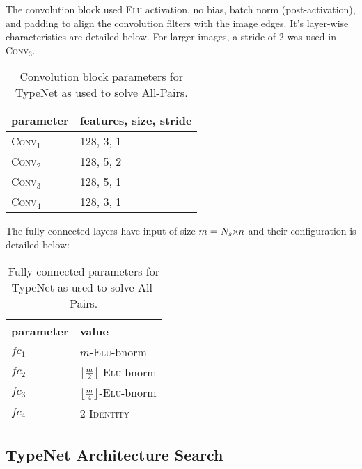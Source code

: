 The convolution block used \textsc{Elu} activation, no bias, batch norm (post-activation),
and padding to align the convolution filters with the image edges.  It's layer-wise characteristics are detailed below.  For larger images, a stride of 2 was used in \textsc{Conv}$_3$.
\begin{table}[!htb]
  \centering%
    \begin{tabular}{ l l }
    parameter & features, size, stride  \\
    \hline
    \textsc{Conv}$_1$ & 128, 3, 1  \\ 
    \textsc{Conv}$_2$ & 128, 5, 2  \\
    \textsc{Conv}$_3$ & 128, 5, 1  \\
    \textsc{Conv}$_4$ & 128, 3, 1  \\
    \end{tabular}
  \caption{Convolution block parameters for TypeNet as used to solve All-Pairs.}\label{detail_config_1}
\end{table}

\noindent
The fully-connected layers have input of size $m=N_s \TMS n$ and their configuration is detailed below:
\begin{table}[!htb]
  \centering%
    {\renewcommand{\arraystretch}{1.15}
    \begin{tabular}{ l l }
    parameter & value  \\
    \hline
    $fc_1$ & $m$-\textsc{Elu}-bnorm  \\
    $fc_2$ & $\floor*{\frac{m}{2}}$-\textsc{Elu}-bnorm  \\
    $fc_3$ & $\floor*{\frac{m}{4}}$-\textsc{Elu}-bnorm  \\
    $fc_4$ & $2$-\textsc{Identity}  \\
    \end{tabular}
    }
  \caption{Fully-connected parameters for TypeNet as used to solve All-Pairs.}\label{detail_config_2}
\end{table}

\subsection{TypeNet Architecture Search} \label{allpairsresult_sup}

